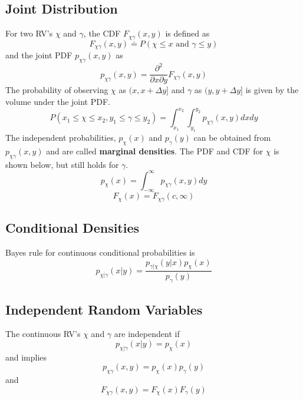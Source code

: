 \documentclass{article}
\begin{document}
    \subsection{Joint Distribution}
    For two RV's $\chi$ and $\gamma$, the CDF $F_{\chi\gamma}(x, y)$ is defined as
    \begin{equation}
        F_{\chi\gamma}(x, y) \doteq P(\chi \le x \textrm{ and } \gamma \le y)
    \end{equation}
    and the joint PDF $p_{\chi\gamma}(x, y)$ as
    \begin{equation}
        p_{\chi\gamma}(x, y) = \frac{\partial^2}{\partial x\partial y}F_{\chi\gamma}(x, y)
    \end{equation}
    The probability of observing $\chi$ as $(x, x+\Delta y]$ and $\gamma$ as $(y, y+\Delta y]$ is given by the volume 
    under the joint PDF.
    \begin{equation}
        P(x_1 \le \chi \le x_2, y_1 \le \gamma \le y_2) = \int_{x_1}^{x_2}\int_{y_1}^{y_2}p_{\chi\gamma}(x, y)dx dy
    \end{equation}
    The independent probabilities, $p_{\chi}(x)$ and $p_{\gamma}(y)$ can be obtained from $p_{\chi\gamma}(x, y)$ and
    are called \textbf{marginal densities}. The PDF and CDF for $\chi$ is shown below, but still holds for $\gamma$.
    \begin{equation}
        p_{\chi}(x) = \int_{-\infty}^{\infty}p_{\chi\gamma}(x, y)dy
    \end{equation}
    \begin{equation}
        F_{\chi}(x) = F_{\chi\gamma}(c, \infty)
    \end{equation}

    \subsection{Conditional Densities}
    Bayes rule for continuous conditional probabilities is
    \begin{equation}
        p_{\chi|\gamma}(x|y) = \frac{p_{\gamma|\chi}(y|x)p_{\chi}(x)}{p_{\gamma}(y)}
    \end{equation}

    \subsection{Independent Random Variables}
    The continuous RV's $\chi$ and $\gamma$ are independent if 
    \begin{equation}
        p_{\chi|\gamma}(x|y) = p_{\chi}(x)
    \end{equation}
    and implies 
    \begin{equation}
        p_{\chi\gamma}(x, y) = p_{\chi}(x)p_{\gamma}(y)
    \end{equation}
    and 
    \begin{equation}
        F_{\chi\gamma}(x, y) = F_{\chi}(x)F_{\gamma}(y)
    \end{equation}
\end{document}
